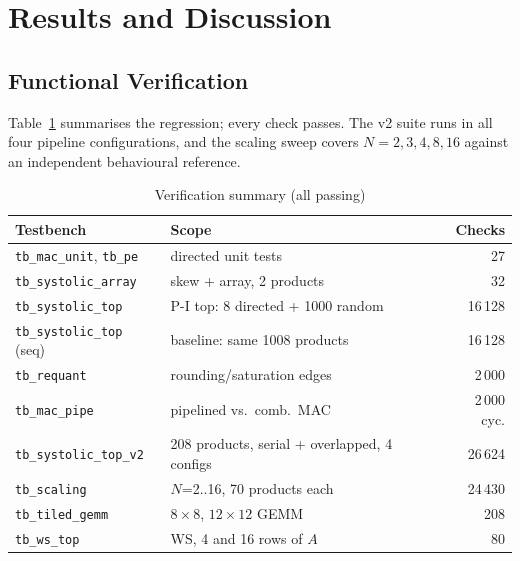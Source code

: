 \section{Results and Discussion}

\subsection{Functional Verification}
Table~\ref{tab:verif} summarises the regression; every check passes. The
v2 suite runs in all four pipeline configurations, and the scaling sweep
covers $N=2,3,4,8,16$ against an independent behavioural reference.

\begin{table}[t]
\centering
\caption{Verification summary (all passing)}
\label{tab:verif}
\setlength{\tabcolsep}{2.5pt}
\begin{tabular}{@{}lp{4.1cm}r@{}}
\toprule
\textbf{Testbench} & \textbf{Scope} & \textbf{Checks}\\
\midrule
\texttt{tb\_mac\_unit}, \texttt{tb\_pe} & directed unit tests & 27 \\
\texttt{tb\_systolic\_array} & skew + array, 2 products & 32 \\
\texttt{tb\_systolic\_top} & P-I top: 8 directed + 1000 random & 16\,128 \\
\texttt{tb\_systolic\_top} (seq) & baseline: same 1008 products & 16\,128 \\
\texttt{tb\_requant} & rounding/saturation edges & 2\,000 \\
\texttt{tb\_mac\_pipe} & pipelined vs.\ comb.\ MAC & 2\,000 cyc. \\
\texttt{tb\_systolic\_top\_v2} & 208 products, serial + overlapped, 4 configs & 26\,624 \\
\texttt{tb\_scaling} & $N$=2..16, 70 products each & 24\,430 \\
\texttt{tb\_tiled\_gemm} & $8\times8$, $12\times12$ GEMM & 208 \\
\texttt{tb\_ws\_top} & WS, 4 and 16 rows of $A$ & 80 \\
\bottomrule
\end{tabular}
\end{table}
